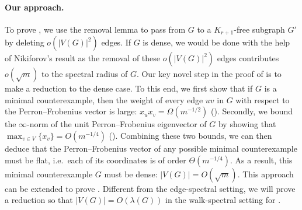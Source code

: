 \documentclass[11pt,a4paper]{article}
\theoremstyle{definition}
\theoremstyle{remark}
\begin{document}
\paragraph{Our approach.} 
To prove , we use the removal lemma to pass from $G$ to a $K_{r+1}$-free subgraph $G'$ by deleting $o(|V(G)|^2)$ edges. If $G$ is dense, we would be done with the help of Nikiforov's result as the removal of these $o(|V(G)|^2)$ edges contributes $o(\sqrt{m})$ to the spectral radius of $G$. Our key novel step in the proof of  is to make a reduction to the dense case. To this end,  
we first show that if $G$ is a minimal counterexample, then the weight of every edge $uv$ in $G$ with respect to the Perron--Frobenius vector is large: $x_ux_v=\Omega (m^{-1/2})$ (). Secondly, 
we bound the $\infty$-norm of the unit Perron--Frobenius eigenvector of $G$ by showing that $\max_{v\in V}\{x_v\}=O(m^{-1/4})$ (). Combining these two bounds, we can then deduce that the Perron--Frobenius vector of any possible minimal counterexample must be flat, i.e.~each of its coordinates is of order $\Theta(m^{-1/4})$. As a result, this minimal counterexample $G$ must be dense: $|V(G)|=O(\sqrt{m})$. This approach can be extended to prove . Different from the edge-spectral setting, we will prove a reduction so that $|V(G)|=O(\lambda (G))$ in the walk-spectral setting for .  
\end{document}
